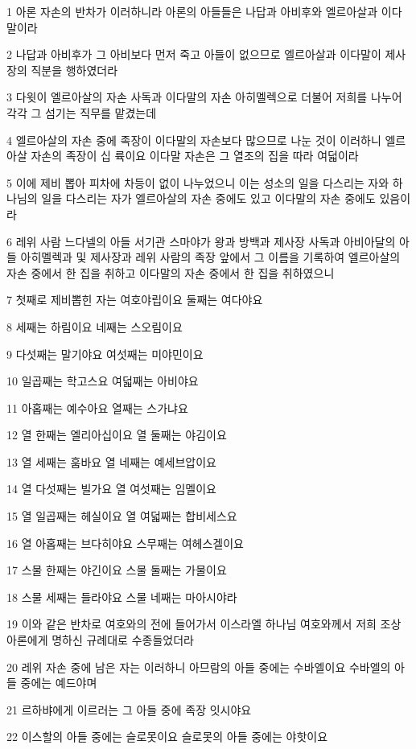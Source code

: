 \par 1 아론 자손의 반차가 이러하니라 아론의 아들들은 나답과 아비후와 엘르아살과 이다말이라
\par 2 나답과 아비후가 그 아비보다 먼저 죽고 아들이 없으므로 엘르아살과 이다말이 제사장의 직분을 행하였더라
\par 3 다윗이 엘르아살의 자손 사독과 이다말의 자손 아히멜렉으로 더불어 저희를 나누어 각각 그 섬기는 직무를 맡겼는데
\par 4 엘르아살의 자손 중에 족장이 이다말의 자손보다 많으므로 나눈 것이 이러하니 엘르아살 자손의 족장이 십 륙이요 이다말 자손은 그 열조의 집을 따라 여덟이라
\par 5 이에 제비 뽑아 피차에 차등이 없이 나누었으니 이는 성소의 일을 다스리는 자와 하나님의 일을 다스리는 자가 엘르아살의 자손 중에도 있고 이다말의 자손 중에도 있음이라
\par 6 레위 사람 느다넬의 아들 서기관 스마야가 왕과 방백과 제사장 사독과 아비아달의 아들 아히멜렉과 및 제사장과 레위 사람의 족장 앞에서 그 이름을 기록하여 엘르아살의 자손 중에서 한 집을 취하고 이다말의 자손 중에서 한 집을 취하였으니
\par 7 첫째로 제비뽑힌 자는 여호야립이요 둘째는 여다야요
\par 8 세째는 하림이요 네째는 스오림이요
\par 9 다섯째는 말기야요 여섯째는 미야민이요
\par 10 일곱째는 학고스요 여덟째는 아비야요
\par 11 아홉째는 예수아요 열째는 스가냐요
\par 12 열 한째는 엘리아십이요 열 둘째는 야김이요
\par 13 열 세째는 훔바요 열 네째는 예세브압이요
\par 14 열 다섯째는 빌가요 열 여섯째는 임멜이요
\par 15 열 일곱째는 헤실이요 열 여덟째는 합비세스요
\par 16 열 아홉째는 브다히야요 스무째는 여헤스겔이요
\par 17 스물 한째는 야긴이요 스물 둘째는 가물이요
\par 18 스물 세째는 들라야요 스물 네째는 마아시야라
\par 19 이와 같은 반차로 여호와의 전에 들어가서 이스라엘 하나님 여호와께서 저희 조상 아론에게 명하신 규례대로 수종들었더라
\par 20 레위 자손 중에 남은 자는 이러하니 아므람의 아들 중에는 수바엘이요 수바엘의 아들 중에는 예드야며
\par 21 르하뱌에게 이르러는 그 아들 중에 족장 잇시야요
\par 22 이스할의 아들 중에는 슬로못이요 슬로못의 아들 중에는 야핫이요
